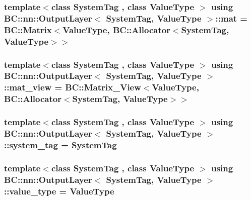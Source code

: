 \subsubsection[{\texorpdfstring{mat}{mat}}]{\setlength{\rightskip}{0pt plus 5cm}template$<$class System\+Tag , class Value\+Type $>$ using {\bf B\+C\+::nn\+::\+Output\+Layer}$<$ System\+Tag, Value\+Type $>$\+::{\bf mat} =  {\bf B\+C\+::\+Matrix}$<$Value\+Type, {\bf B\+C\+::\+Allocator}$<$System\+Tag, Value\+Type$>$$>$}\hypertarget{structBC_1_1nn_1_1OutputLayer_a0b0f4e2b2c45882e60ee3cc95a817b59}{}\label{structBC_1_1nn_1_1OutputLayer_a0b0f4e2b2c45882e60ee3cc95a817b59}
\subsubsection[{\texorpdfstring{mat\+\_\+view}{mat_view}}]{\setlength{\rightskip}{0pt plus 5cm}template$<$class System\+Tag , class Value\+Type $>$ using {\bf B\+C\+::nn\+::\+Output\+Layer}$<$ System\+Tag, Value\+Type $>$\+::{\bf mat\+\_\+view} =  {\bf B\+C\+::\+Matrix\+\_\+\+View}$<$Value\+Type, {\bf B\+C\+::\+Allocator}$<$System\+Tag, Value\+Type$>$$>$}\hypertarget{structBC_1_1nn_1_1OutputLayer_aeb45a3c352a438cfb69bb17b40a14bf2}{}\label{structBC_1_1nn_1_1OutputLayer_aeb45a3c352a438cfb69bb17b40a14bf2}
\subsubsection[{\texorpdfstring{system\+\_\+tag}{system_tag}}]{\setlength{\rightskip}{0pt plus 5cm}template$<$class System\+Tag , class Value\+Type $>$ using {\bf B\+C\+::nn\+::\+Output\+Layer}$<$ System\+Tag, Value\+Type $>$\+::{\bf system\+\_\+tag} =  System\+Tag}\hypertarget{structBC_1_1nn_1_1OutputLayer_a1b77b5de073e3b5d31971c330f2bfff0}{}\label{structBC_1_1nn_1_1OutputLayer_a1b77b5de073e3b5d31971c330f2bfff0}
\subsubsection[{\texorpdfstring{value\+\_\+type}{value_type}}]{\setlength{\rightskip}{0pt plus 5cm}template$<$class System\+Tag , class Value\+Type $>$ using {\bf B\+C\+::nn\+::\+Output\+Layer}$<$ System\+Tag, Value\+Type $>$\+::{\bf value\+\_\+type} =  Value\+Type}\hypertarget{structBC_1_1nn_1_1OutputLayer_ada8d5620e6240f6faa1e6d30d5ac13ff}{}\label{structBC_1_1nn_1_1OutputLayer_ada8d5620e6240f6faa1e6d30d5ac13ff}

